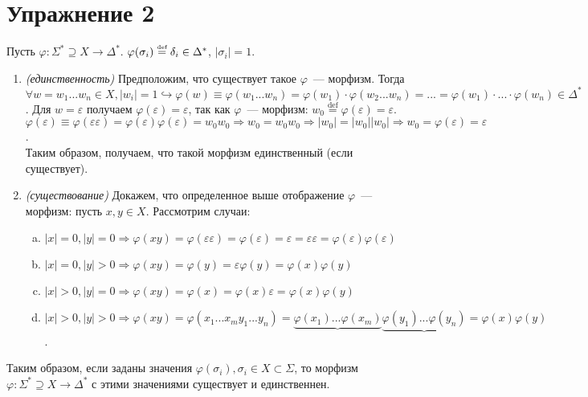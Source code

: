 \documentclass[a4paper]{article}
\begin{document}
\section*{Упражнение 2}
Пусть $\varphi\colon\Sigma^*\supseteq X\longrightarrow\Delta^*$. $\varphi(\sigma_i)\overset{\mbox{\tiny def}}{=}\delta_i\in\Delta^*$, $|\sigma_i|=1$.\newline
\begin{enumerate}
\item {\em (единственность)} Предположим, что существует такое $\varphi$~--- морфизм. Тогда $\forall w=w_1...w_n\in X, |w_i|=1\hookrightarrow\varphi(w)\equiv \varphi(w_1...w_n)=\varphi(w_1)\cdot\varphi(w_2...w_n)=...=\varphi(w_1)\cdot...\cdot\varphi(w_n)\in\Delta^*$. Для $w=\varepsilon$ получаем $\varphi(\varepsilon)=\varepsilon$, так как $\varphi$~--- морфизм: $w_0\overset{\mathrm{def}}{=}\varphi(\varepsilon)=\varepsilon$. $\varphi(\varepsilon)\equiv\varphi(\varepsilon\varepsilon)=\varphi(\varepsilon)\varphi(\varepsilon)=w_0w_0\Rightarrow w_0=w_0w_0\Rightarrow |w_0|=|w_0||w_0|\Rightarrow w_0=\varphi(\varepsilon)=\varepsilon$.
\\[5pt]
Таким образом, получаем, что такой морфизм единственный (если существует).
\item {\em (существование)} Докажем, что определенное выше отображение $\varphi$~--- морфизм: пусть $x,y\in X$. Рассмотрим случаи:
\begin{enumerate}[a.]
\item $|x|=0,|y|=0\Rightarrow\varphi(xy)=\varphi(\varepsilon\varepsilon)=\varphi(\varepsilon)=\varepsilon=\varepsilon\varepsilon=\varphi(\varepsilon)\varphi(\varepsilon)$
\item $|x|=0,|y|>0\Rightarrow\varphi(xy)=\varphi(y)=\varepsilon\varphi(y)=\varphi(x)\varphi(y)$
\item $|x|>0,|y|=0\Rightarrow\varphi(xy)=\varphi(x)=\varphi(x)\varepsilon=\varphi(x)\varphi(y)$
\item $|x|>0,|y|>0\Rightarrow\varphi(xy)=\varphi(x_1...x_my_1...y_n)=\underbrace{\varphi(x_1)...\varphi(x_m)}\underbrace{\varphi(y_1)...\varphi(y_n)}=\varphi(x)\varphi(y)$.
\end{enumerate}
\end{enumerate}
Таким образом, если заданы значения $\varphi(\sigma_i),\sigma_i\in X\subset\Sigma$, то морфизм $\varphi\colon \Sigma^*\supseteq X\longrightarrow\Delta^*$ с этими значениями существует и единственнен.
\end{document}
